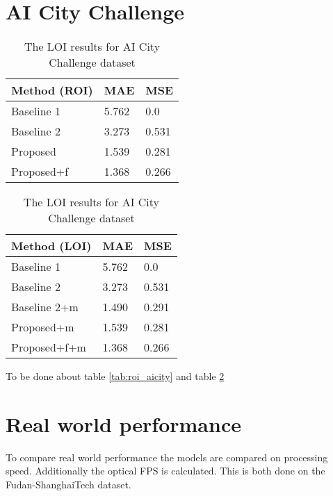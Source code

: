 \section{AI City Challenge}

\begin{table}[!htb]
    \begin{minipage}{.5\linewidth}
      \centering
		\begin{tabular}{lll}
		\hline
		Method (ROI)                               & MAE & MSE \\ \hline
		\multicolumn{1}{l|}{Baseline 1}          & 5.762 & 0.0 \\
		\multicolumn{1}{l|}{Baseline 2}          & 3.273 & 0.531 \\
		\multicolumn{1}{l|}{Proposed}        	 & 1.539 & 0.281 \\
		\multicolumn{1}{l|}{Proposed+f} & 1.368 & 0.266 \\ \hline
		\end{tabular}
		\caption{\label{tab:roi_aicity}The ROI results for AI City Challenge dataset}
	\end{minipage}
	\begin{minipage}{.5\linewidth}
      \centering
		\begin{tabular}{lll}
		\hline
		Method (LOI)                               & MAE & MSE \\ \hline
		\multicolumn{1}{l|}{Baseline 1}          & 5.762 & 0.0 \\
		\multicolumn{1}{l|}{Baseline 2}          & 3.273 & 0.531 \\
		\multicolumn{1}{l|}{Baseline 2+m}      & 1.490 & 0.291 \\
		\multicolumn{1}{l|}{Proposed+m}        	 & 1.539 & 0.281 \\
		\multicolumn{1}{l|}{Proposed+f+m} & 1.368 & 0.266 \\ \hline
		\end{tabular}
		\caption{\label{tab:loi_aicity}The LOI results for AI City Challenge dataset}
	\end{minipage}
\end{table}

To be done about table \ref{tab:roi_aicity} and table \ref{tab:loi_aicity}


\section{Real world performance}
To compare real world performance the models are compared on processing speed. Additionally the optical FPS is calculated. This is both done on the Fudan-ShanghaiTech dataset.

